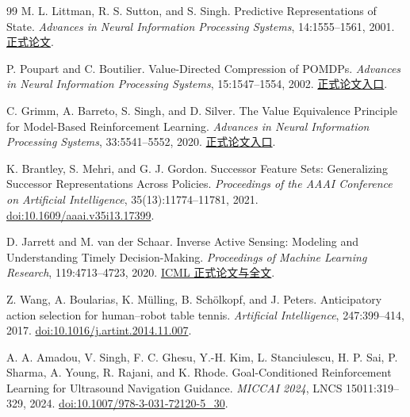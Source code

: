 \documentclass[11pt,a4paper,fontset=fandol]{ctexart}
\theoremstyle{definition}
\theoremstyle{remark}
\numberwithin{equation}{section}
\begin{document}
\begin{thebibliography}{99}
M. L. Littman, R. S. Sutton, and S. Singh.
Predictive Representations of State.
\emph{Advances in Neural Information Processing Systems}, 14:1555--1561, 2001.
\href{https://proceedings.neurips.cc/paper/2001/file/1e4d36177d71bbb3558e43af9577d70e-Paper.pdf}{正式论文}.

P. Poupart and C. Boutilier. Value-Directed Compression of POMDPs.
\emph{Advances in Neural Information Processing Systems}, 15:1547--1554, 2002.
\href{https://papers.nips.cc/paper_files/paper/2002/hash/14ea0d5b0cf49525d1866cb1e95ada5d-Abstract.html}{正式论文入口}.

C. Grimm, A. Barreto, S. Singh, and D. Silver.
The Value Equivalence Principle for Model-Based Reinforcement Learning.
\emph{Advances in Neural Information Processing Systems}, 33:5541--5552, 2020.
\href{https://proceedings.neurips.cc/paper/2020/hash/3bb585ea00014b0e3ebe4c6dd165a358-Abstract.html}{正式论文入口}.

K. Brantley, S. Mehri, and G. J. Gordon.
Successor Feature Sets: Generalizing Successor Representations Across Policies.
\emph{Proceedings of the AAAI Conference on Artificial Intelligence}, 35(13):11774--11781, 2021.
\href{https://doi.org/10.1609/aaai.v35i13.17399}{doi:10.1609/aaai.v35i13.17399}.

D. Jarrett and M. van der Schaar.
Inverse Active Sensing: Modeling and Understanding Timely Decision-Making.
\emph{Proceedings of Machine Learning Research}, 119:4713--4723, 2020.
\href{https://proceedings.mlr.press/v119/jarrett20a.html}{ICML 正式论文与全文}.

Z. Wang, A. Boularias, K. M\"ulling, B. Sch\"olkopf, and J. Peters.
Anticipatory action selection for human--robot table tennis.
\emph{Artificial Intelligence}, 247:399--414, 2017.
\href{https://doi.org/10.1016/j.artint.2014.11.007}{doi:10.1016/j.artint.2014.11.007}.

A. A. Amadou, V. Singh, F. C. Ghesu, Y.-H. Kim, L. Stanciulescu, H. P. Sai, P. Sharma, A. Young, R. Rajani, and K. Rhode.
Goal-Conditioned Reinforcement Learning for Ultrasound Navigation Guidance.
\emph{MICCAI 2024}, LNCS 15011:319--329, 2024.
\href{https://doi.org/10.1007/978-3-031-72120-5_30}{doi:10.1007/978-3-031-72120-5\_30}.
\end{thebibliography}
\end{document}
